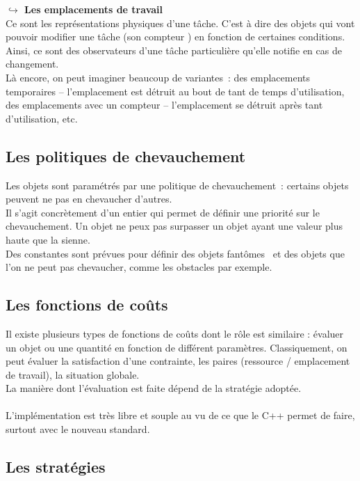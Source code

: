 \textbf{$\hookrightarrow$ Les emplacements de travail}\\

Ce sont les représentations physiques d'une tâche. C'est à dire des objets qui vont pouvoir modifier une tâche (son \og compteur \fg ) en fonction de certaines conditions.\\
\indent Ainsi, ce sont des observateurs d'une tâche particulière qu'elle notifie en cas de changement.\\

Là encore, on peut imaginer beaucoup de variantes~: des emplacements temporaires – l'emplacement est détruit au bout de tant de temps d'utilisation, des emplacements avec un compteur – l'emplacement se détruit après tant d'utilisation, etc.

\subsection{Les politiques de chevauchement}

Les objets sont paramétrés par une politique de chevauchement~: certains objets peuvent ne pas en chevaucher d'autres.\\
\indent Il s'agit concrètement d'un entier qui permet de définir une priorité sur le chevauchement. Un objet ne peux pas surpasser un objet ayant une valeur plus haute que la sienne.\\
\indent Des constantes sont prévues pour définir des objets \og fantômes \fg ~et des objets que l'on ne peut pas chevaucher, comme les obstacles par exemple.

\subsection{Les fonctions de coûts}

Il existe plusieurs types de fonctions de coûts dont le rôle est similaire : évaluer un objet ou une quantité en fonction de différent paramètres. Classiquement, on peut évaluer la satisfaction d'une contrainte, les paires (ressource / emplacement de travail), la situation globale.\\
La manière dont l'évaluation est faite dépend de la stratégie adoptée.\\\\

L'implémentation est très libre et souple au vu de ce que le C++ permet de faire, surtout avec le nouveau standard.

\subsection{Les stratégies}

